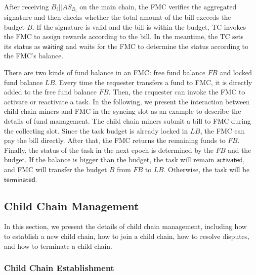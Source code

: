 \documentclass[10pt,journal]{IEEEtran}
\begin{document}
After receiving $B_i || AS_{B_i}$ on the main chain, the FMC verifies the aggregated signature and then checks whether the total amount of the bill exceeds the budget $B$. If the signature is valid and the bill is within the budget, TC invokes the FMC to assign rewards according to the bill. In the meantime, the TC sets its status as $\mathsf{waiting}$ and waits for the FMC to determine the status according to the FMC's balance.

There are two kinds of fund balance in an FMC: free fund balance $FB$ and locked fund balance $LB$. Every time the requester transfers a fund to FMC, it is directly added to the free fund balance $FB$. Then, the requester can invoke the FMC to activate or reactivate a task. In the following, we present the interaction between child chain miners and FMC in the syncing slot as an example to describe the details of fund management. The child chain miners submit a bill to FMC during the collecting slot. Since the task budget is already locked in $LB$, the FMC can pay the bill directly. After that, the FMC returns the remaining funds to $FB$. Finally, the status of the task in the next epoch is determined by the $FB$ and the budget. If the balance is bigger than the budget, the task will remain $\mathsf{activated}$, and FMC will transfer the budget $B$ from $FB$ to $LB$. Otherwise, the task will be $\mathsf{terminated}$.

\subsection{Child Chain Management}\label{subsec:childchain_management}
In this section, we present the details of child chain management, including how to establish a new child chain, how to join a child chain, how to resolve disputes, and how to terminate a child chain.

\subsubsection{\textbf{Child Chain Establishment}}
\end{document}
